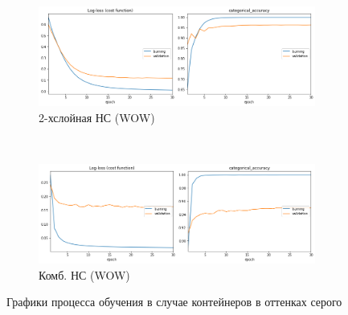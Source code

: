 \begin{figure}[p]
\bigskip
    \begin{subfigure}[b]{0.485\textwidth}
        \includegraphics[width=\textwidth]{include/graphics/experimental_plots/grayscale/french_wow}
                    \caption{2-хслойная НС (WOW)}
    \end{subfigure}
    ~
    \begin{subfigure}[b]{0.485\textwidth}
        \includegraphics[width=\textwidth]{include/graphics/experimental_plots/grayscale/mixed_wow}
            \caption{Комб. НС (WOW)}
    \end{subfigure}

    \caption{Графики процесса обучения в случае контейнеров в оттенках серого}
    \label{fig:GrayscalePlots}
\end{figure}

